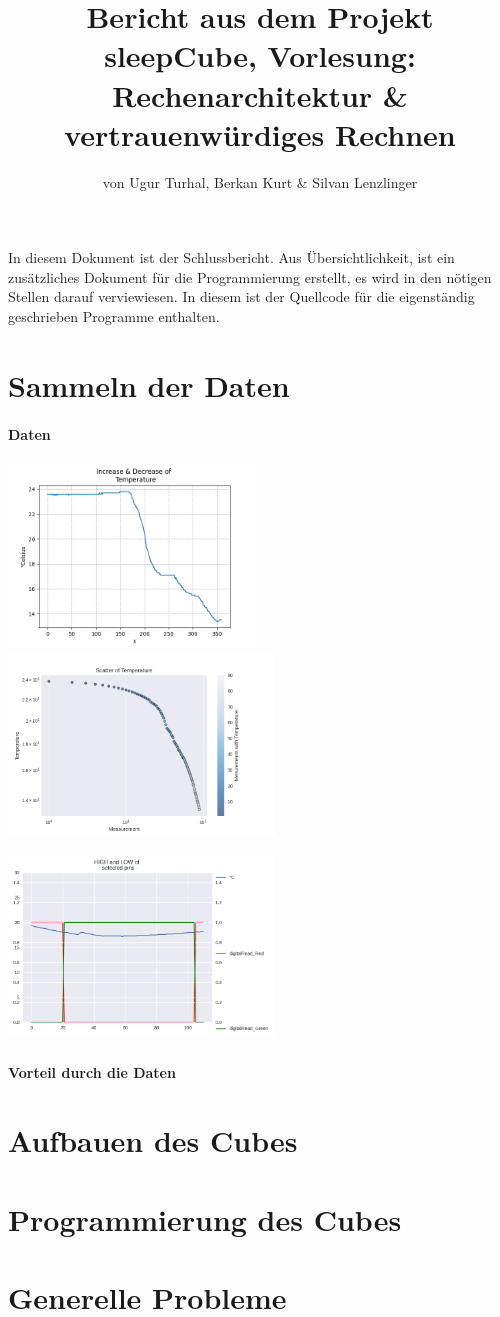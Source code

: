 \documentclass{article}
\title{Bericht aus dem Projekt sleepCube, Vorlesung: Rechenarchitektur \& vertrauenwürdiges Rechnen}
\author{von Ugur Turhal, Berkan Kurt \& Silvan Lenzlinger}
\begin{document}
\maketitle
In diesem Dokument ist der Schlussbericht. Aus Übersichtlichkeit, ist ein zusätzliches Dokument für die Programmierung erstellt, es wird in den nötigen Stellen darauf verviewiesen. In diesem ist der Quellcode für die eigenständig geschrieben Programme enthalten. 

\section*{Sammeln der Daten}
\paragraph{Daten}
\begin{center}
\includegraphics[width=0.49\textwidth]{plot.png}\includegraphics[width=0.53\textwidth]{scatter.png}
\end{center}

\begin{center}
\includegraphics[width=0.53\textwidth]{digitalRead.png}
\end{center}

\paragraph{Vorteil durch die Daten}
\section*{Aufbauen des Cubes}



\section*{Programmierung des Cubes}

\section*{Generelle Probleme}
\end{document}
